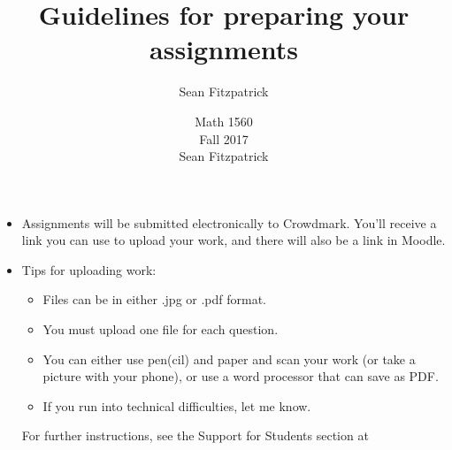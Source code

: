 \documentclass[letterpaper,12pt]{article}
\author{Sean Fitzpatrick}
\title{Guidelines for preparing your assignments}
\author{Math 1560\\Fall 2017\\Sean Fitzpatrick}
\begin{document}
\maketitle

\begin{itemize}
 \item Assignments will be submitted electronically to Crowdmark. You'll receive a link you can use to upload your work, and there will also be a link in Moodle.
 \item Tips for uploading work:
 \begin{itemize}
 \item Files can be in either .jpg or .pdf format.
 \item You must upload one file for each question.
 \item You can either use pen(cil) and paper and scan your work (or take a picture with your phone), or use a word processor that can save as PDF.
 \item If you run into technical difficulties, let me know.
 \end{itemize}
 For further instructions, see the Support for Students section at
 

\end{itemize}
\end{document}

